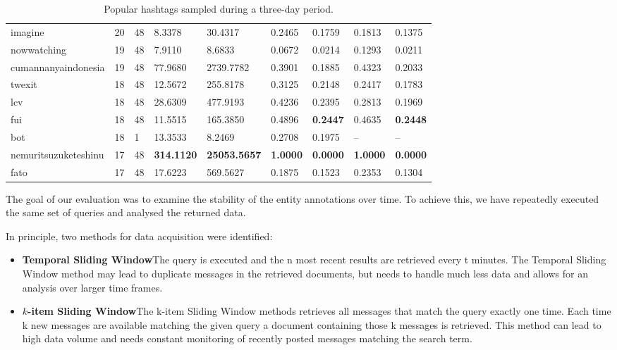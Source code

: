 \documentclass{llncs}
\begin{document}
\begin{table}[ht*]
\begin{tabular}{ l|l|l|l|l|l|l|l|l }
imagine & 20 & 48	& 8.3378 & 30.4317 & 0.2465 & 0.1759 & 0.1813 & 0.1375 \\
nowwatching & 19 & 48 & 7.9110 & 8.6833 & 0.0672 & 0.0214 & 0.1293 & 0.0211 \\
cumannanyaindonesia & 19 & 48 & 77.9680 & 2739.7782 & 0.3901 & 0.1885 & 0.4323 & 0.2033 \\
twexit & 18 & 48 & 12.5672 & 255.8178 & 0.3125 & 0.2148 & 0.2417 & 0.1783 \\
lcv & 18 & 48 & 28.6309 & 477.9193 & 0.4236 & 0.2395 & 0.2813 & 0.1969 \\
fui & 18 & 48 & 11.5515 & 165.3850 & 0.4896 & \textbf{0.2447} & 0.4635 & \textbf{0.2448} \\
bot &      18 & 1 & 13.3533 &	8.2469 & 0.2708 & 0.1975 & -- & --  \\
nemuritsuzuketeshinu & 17 & 48 & \textbf{314.1120} & \textbf{25053.5657} & \textbf{1.0000} & \textbf{0.0000} & \textbf{1.0000} & \textbf{0.0000} \\
fato & 17 & 48 & 17.6223 & 569.5627 & 0.1875 & 0.1523 & 0.2353 & 0.1304 \\
\end{tabular}
\caption{Popular hashtags sampled during a three-day period.}\label{tbl:hashtags}
\end{table}


The goal of our evaluation was to examine the stability of the entity annotations over time. To achieve this, we have repeatedly executed the same set of queries and analysed the returned data. 

In principle, two methods for data acquisition were identified: \begin{definition}
\begin{itemize}
\item {\bf Temporal Sliding Window}\newline The query is executed and the n
most recent results are retrieved every t minutes. The Temporal Sliding Window
method may lead to duplicate messages in the retrieved documents, but needs to
handle much less data and allows for an analysis over larger time frames.
\item {\bf $k$-item Sliding Window}\newline  The k-item Sliding Window methods
retrieves all messages that match the query exactly one time. Each time k new messages are
available matching the given query a document containing those k messages
is retrieved. This method can lead to high data volume and needs constant
monitoring of recently posted messages matching the search term.
\end{itemize}
\end{definition}
\end{document}
